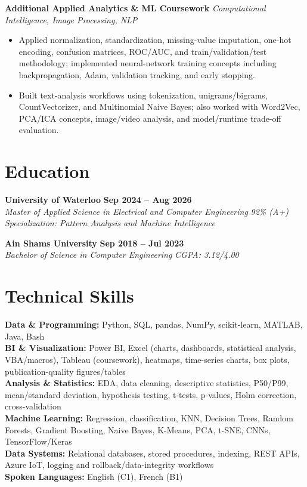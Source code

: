 \documentclass[letterpaper,11pt]{article}
\newcommand{\resumeSubheading}[4]{
  \textbf{#1} \hfill \textbf{#2} \\
  \textit{#3} \hfill \textit{#4} \\
}
\newcommand{\resumeProjectHeading}[2]{
  \textbf{#1} \hfill \textit{#2} \\
}
\begin{document}
\resumeProjectHeading
{Additional Applied Analytics \& ML Coursework}{Computational Intelligence, Image Processing, NLP}
\begin{itemize}
    \item Applied normalization, standardization, missing-value imputation, one-hot encoding, confusion matrices, ROC/AUC, and train/validation/test methodology; implemented neural-network training concepts including backpropagation, Adam, validation tracking, and early stopping.
    \item Built text-analysis workflows using tokenization, unigrams/bigrams, CountVectorizer, and Multinomial Naive Bayes; also worked with Word2Vec, PCA/ICA concepts, image/video analysis, and model/runtime trade-off evaluation.
\end{itemize}

\section{Education}

\textbf{University of Waterloo} \hfill \textbf{Sep 2024 -- Aug 2026} \\
\textit{Master of Applied Science in Electrical and Computer Engineering} \hfill \textit{92\% (A+)} \\
\textit{Specialization: Pattern Analysis and Machine Intelligence} \\

\vspace{4pt}

\resumeSubheading
{Ain Shams University}{Sep 2018 -- Jul 2023}
{Bachelor of Science in Computer Engineering}{CGPA: 3.12/4.00}

\section{Technical Skills}

\textbf{Data \& Programming:} Python, SQL, pandas, NumPy, scikit-learn, MATLAB, Java, Bash \\
\textbf{BI \& Visualization:} Power BI, Excel (charts, dashboards, statistical analysis, VBA/macros), Tableau (coursework), heatmaps, time-series charts, box plots, publication-quality figures/tables \\
\textbf{Analysis \& Statistics:} EDA, data cleaning, descriptive statistics, P50/P99, mean/standard deviation, hypothesis testing, t-tests, p-values, Holm correction, cross-validation \\
\textbf{Machine Learning:} Regression, classification, KNN, Decision Trees, Random Forests, Gradient Boosting, Naive Bayes, K-Means, PCA, t-SNE, CNNs, TensorFlow/Keras \\
\textbf{Data Systems:} Relational databases, stored procedures, indexing, REST APIs, Azure IoT, logging and rollback/data-integrity workflows \\
\textbf{Spoken Languages:} English (C1), French (B1)
\end{document}
